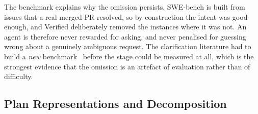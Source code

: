 \documentclass[
  english,        %
  font=times,     %
  twocolumn,      %
]{tumarticle}
\begin{document}
The benchmark explains why the omission persists. SWE-bench is built from issues
that a real merged PR resolved, so by construction the intent was good enough, and
Verified deliberately removed the instances where it was not. An agent is
therefore never rewarded for asking, and never penalised for guessing wrong about
a genuinely ambiguous request. The clarification literature had to build a
\emph{new} benchmark~\cite{vijayvargiya2026ambiguity} before the stage could be
measured at all, which is the strongest evidence that the omission is an artefact
of evaluation rather than of difficulty.

\subsection{Plan Representations and Decomposition}
\end{document}

